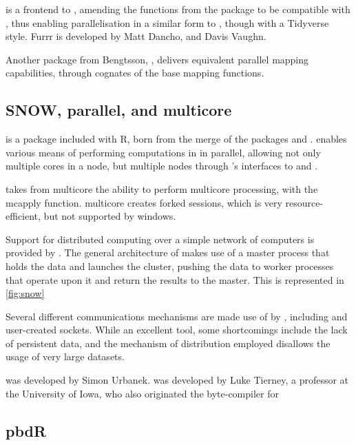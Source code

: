  is a frontend to , amending the functions from the package
 to be compatible with , thus enabling parallelisation in a
similar form to , though with a Tidyverse
style\cite{vaughan18}.
Furrr is developed by Matt Dancho, and Davis Vaughn.

Another package from Bengtsson, , delivers equivalent parallel mapping capabilities, through cognates of the base \R{} mapping functions.

\subsection{SNOW, parallel, and multicore}\label{subsec:parall-snow-mult}

 is a package included with R, born from the merge of the
packages  and \cite{core:_packag}.  enables
various means of performing computations in \R{} in parallel, allowing not
only multiple cores in a node, but multiple nodes through 's
interfaces to  and \cite{tierney2018snow}.

 takes from multicore the ability to perform multicore
processing, with the mcapply function. multicore creates forked \R{}
sessions, which is very resource-efficient, but not supported by
windows.

Support for distributed computing over a simple network of computers is provided by .
The general architecture of  makes use of a master process that holds the data and launches the cluster, pushing the data to worker processes that operate upon it and return the results to the master.
This is represented in \cref{fig:snow}


Several different communications mechanisms are made use of by , including  and user-created sockets.
While an excellent tool, some shortcomings include the lack of persistent data, and the mechanism of distribution employed disallows the usage of very large datasets.

 was developed by Simon Urbanek.  was developed by Luke Tierney, a professor at the University of Iowa, who also originated the byte-compiler for \R{}

\subsection{pbdR}\label{subsec:pbdr}

